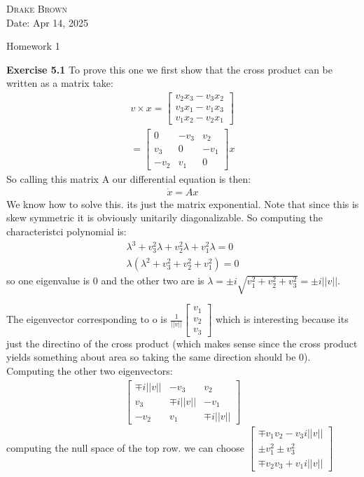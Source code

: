 \documentclass[12pt]{article}
\newenvironment{exercise}[1]{\vspace{.1in}\noindent\textbf{Exercise #1 \hspace{.05em}}}{}
\theoremstyle{definition}
\theoremstyle{remark}
\begin{document}
\begin{flushright}
	\textsc{Drake Brown}  \\
	Date: Apr 14, 2025
\end{flushright}
\begin{center}
	Homework 1
\end{center}

\begin{exercise}{5.1}
	To prove this one we first show that the cross product can be written as a matrix take:
	\begin{align}
		v\times x = %
		\begin{bmatrix}
			v_2x_3-v_3x_2 \\
			v_3x_1-v_1x_3 \\
			v_1x_2-v_2x_1
		\end{bmatrix} \\
		=%
		\begin{bmatrix}
			0    & -v_3 & v_2  \\
			v_3  & 0    & -v_1 \\
			-v_2 & v_1  & 0
		\end{bmatrix}x
	\end{align}
	So calling this matrix A our differential equation is then:
	\begin{align}
		\dot{x}=Ax
	\end{align}
	We know how to solve this. its just the matrix exponential. Note that since this is skew symmetric it is obviously unitarily diagonalizable. So computing the characteristci polynomial is:
	\begin{align}
		\lambda^3+v_3^2\lambda+v_2^2\lambda +v_1^2\lambda=0 \\
		\lambda(\lambda^2+v_3^2+v_2^2+v_1^2)=0
	\end{align}
	so one eigenvalue is $0$ and the other two are is $\lambda = \pm i \sqrt{v_1^2+v_2^2+v_3^2}=\pm i ||v||$.

	The eigenvector corresponding to o is $%
		\frac{1}{||v||}\begin{bmatrix}
			v_1 \\
			v_2 \\
			v_3
		\end{bmatrix}$ which is interesting because its just the directino of the cross product (which makes sense since the cross product yields something about area so taking the same direction should be 0). Computing the other two eigenvectors:
	\begin{align}
		\begin{bmatrix}
			\mp i||v|| & -v_3        & v_2         \\
			v_3        & \mp i ||v|| & -v_1        \\
			-v_2       & v_1         & \mp i ||v||
		\end{bmatrix}
	\end{align}
	computing the null space of the top row. we can choose $%
		\begin{bmatrix}
			\mp v_1v_2-v_3 i||v|| \\
			\pm v_1^2\pm v_3^2    \\
			\mp v_2v_3+v_1 i ||v||
		\end{bmatrix}$


\end{exercise}
\end{document}
